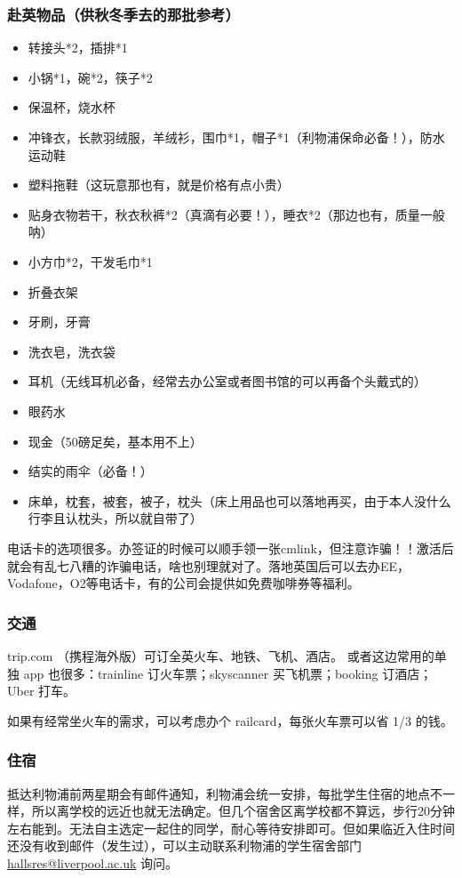 \subsubsection{赴英物品（供秋冬季去的那批参考）}
\begin{itemize}
    \item 转接头*2，插排*1
    \item 小锅*1，碗*2，筷子*2
    \item 保温杯，烧水杯
    \item 冲锋衣，长款羽绒服，羊绒衫，围巾*1，帽子*1（利物浦保命必备！），防水运动鞋
    \item 塑料拖鞋（这玩意那也有，就是价格有点小贵）
    \item 贴身衣物若干，秋衣秋裤*2（真滴有必要！），睡衣*2（那边也有，质量一般呐）
    \item 小方巾*2，干发毛巾*1
    \item 折叠衣架
    \item 牙刷，牙膏
    \item 洗衣皂，洗衣袋
    \item 耳机（无线耳机必备，经常去办公室或者图书馆的可以再备个头戴式的）
    \item 眼药水
    \item 现金（50磅足矣，基本用不上）
    \item 结实的雨伞（必备！）
    \item 床单，枕套，被套，被子，枕头（床上用品也可以落地再买，由于本人没什么行李且认枕头，所以就自带了）
\end{itemize}

电话卡的选项很多。办签证的时候可以顺手领一张cmlink，但注意诈骗！！激活后就会有乱七八糟的诈骗电话，啥也别理就对了。落地英国后可以去办EE，Vodafone，O2等电话卡，有的公司会提供如免费咖啡券等福利。


\subsubsection{交通}
trip.com （携程海外版）可订全英火车、地铁、飞机、酒店。 或者这边常用的单独 app 也很多：trainline 订火车票；skyscanner 买飞机票；booking 订酒店；Uber 打车。

如果有经常坐火车的需求，可以考虑办个 railcard，每张火车票可以省 1/3 的钱。


\subsubsection{住宿}
抵达利物浦前两星期会有邮件通知，利物浦会统一安排，每批学生住宿的地点不一样，所以离学校的远近也就无法确定。但几个宿舍区离学校都不算远，步行20分钟左右能到。无法自主选定一起住的同学，耐心等待安排即可。但如果临近入住时间还没有收到邮件（发生过），可以主动联系利物浦的学生宿舍部门 \href{mailto:hallsres@liverpool.ac.uk}{hallsres@liverpool.ac.uk} 询问。


